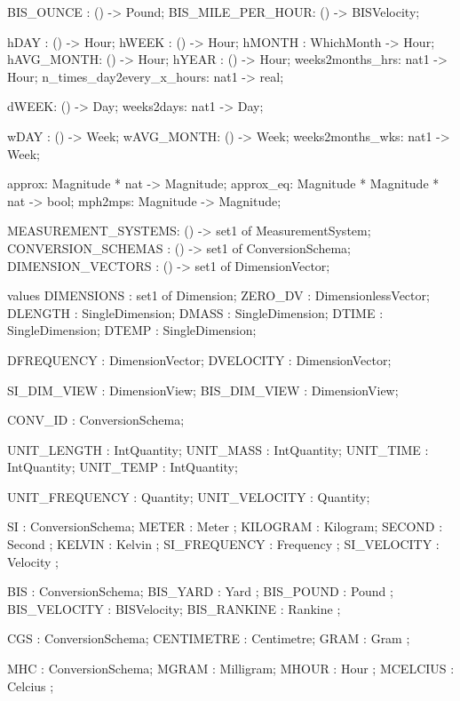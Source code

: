\documentclass[a4paper]{article}
\begin{document}
\begin{vdm_al}
  BIS_OUNCE        : () -> Pound;
  BIS_MILE_PER_HOUR: () -> BISVelocity;
 
  hDAY      : () -> Hour;
  hWEEK     : () -> Hour;
  hMONTH    : WhichMonth -> Hour; 
  hAVG_MONTH: () -> Hour;
  hYEAR     : () -> Hour;
  weeks2months_hrs: nat1 -> Hour;
  n_times_day2every_x_hours: nat1 -> real;
     
  dWEEK: () -> Day;
  weeks2days: nat1 -> Day;
 
  wDAY      : () -> Week;
  wAVG_MONTH: () -> Week;
  weeks2months_wks: nat1 -> Week;
 
  approx: Magnitude * nat -> Magnitude;
  approx_eq: Magnitude * Magnitude * nat -> bool;
  mph2mps: Magnitude -> Magnitude;
 
  MEASUREMENT_SYSTEMS: () -> set1 of MeasurementSystem; 
  CONVERSION_SCHEMAS : () -> set1 of ConversionSchema;
  DIMENSION_VECTORS  : () -> set1 of DimensionVector;

  values
   DIMENSIONS       : set1 of Dimension;
  ZERO_DV          : DimensionlessVector;
  DLENGTH          : SingleDimension;
  DMASS            : SingleDimension;
  DTIME            : SingleDimension;
  DTEMP            : SingleDimension;
                   
  DFREQUENCY       : DimensionVector; 
  DVELOCITY        : DimensionVector; 
 
  SI_DIM_VIEW   : DimensionView;
  BIS_DIM_VIEW  : DimensionView;
                    
  CONV_ID          : ConversionSchema;
  
  UNIT_LENGTH      : IntQuantity; 
  UNIT_MASS        : IntQuantity; 
  UNIT_TIME        : IntQuantity; 
  UNIT_TEMP        : IntQuantity; 

    UNIT_FREQUENCY   : Quantity;
  UNIT_VELOCITY    : Quantity;
 
    SI            : ConversionSchema;   
  METER            : Meter   ;
  KILOGRAM         : Kilogram;
  SECOND          : Second  ;
  KELVIN           : Kelvin  ;
   SI_FREQUENCY     : Frequency   ;
  SI_VELOCITY      : Velocity    ;

  BIS           : ConversionSchema;
  BIS_YARD      : Yard    ;
  BIS_POUND        : Pound   ;
    BIS_VELOCITY  : BISVelocity;
  BIS_RANKINE      : Rankine ;

    CGS              : ConversionSchema;
  CENTIMETRE       : Centimetre;
  GRAM             : Gram   ;

    MHC              : ConversionSchema;
  MGRAM       : Milligram;
  MHOUR            : Hour   ; 
  MCELCIUS         : Celcius ; 


\end{vdm_al}
\end{document}
